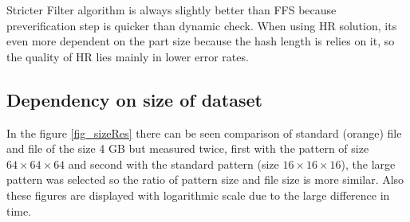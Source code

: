 Stricter Filter algorithm is always slightly better than FFS because preverification step is quicker than dynamic check. When using HR solution, its even more dependent on the part size because the hash length is relies on it, so the quality of HR lies mainly in lower error rates.


\subsection{Dependency on size of dataset}
In the figure \ref{fig_sizeRes} there can be seen comparison of standard (orange) file and file of the size 4 GB but measured twice, first with the pattern of size $64\times64\times64$ and second with the standard pattern (size $16\times16\times16$), the large pattern was selected so the ratio of pattern size and file size is more similar. Also these figures are displayed with logarithmic scale due to the large difference in time. 

